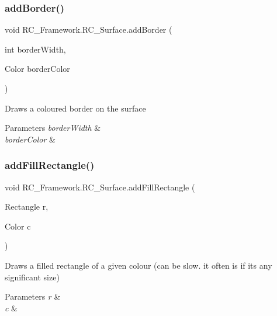 \subsubsection{\texorpdfstring{add\+Border()}{addBorder()}}
{\footnotesize\ttfamily void R\+C\+\_\+\+Framework.\+R\+C\+\_\+\+Surface.\+add\+Border (\begin{DoxyParamCaption}\item[{int}]{border\+Width,  }\item[{Color}]{border\+Color }\end{DoxyParamCaption})}



Draws a coloured border on the surface 


\begin{DoxyParams}{Parameters}
{\em border\+Width} & \\
\hline
{\em border\+Color} & \\
\hline
\end{DoxyParams}
\mbox{\label{class_r_c___framework_1_1_r_c___surface_a93af5231a5d6cb46ce86fc9895a3cd29}} 
\subsubsection{\texorpdfstring{add\+Fill\+Rectangle()}{addFillRectangle()}}
{\footnotesize\ttfamily void R\+C\+\_\+\+Framework.\+R\+C\+\_\+\+Surface.\+add\+Fill\+Rectangle (\begin{DoxyParamCaption}\item[{Rectangle}]{r,  }\item[{Color}]{c }\end{DoxyParamCaption})}



Draws a filled rectangle of a given colour (can be slow. it often is if its any significant size) 


\begin{DoxyParams}{Parameters}
{\em r} & \\
\hline
{\em c} & \\
\hline
\end{DoxyParams}
\mbox{\label{class_r_c___framework_1_1_r_c___surface_abab645c5b58a88c3b1e13d1624163272}} 
